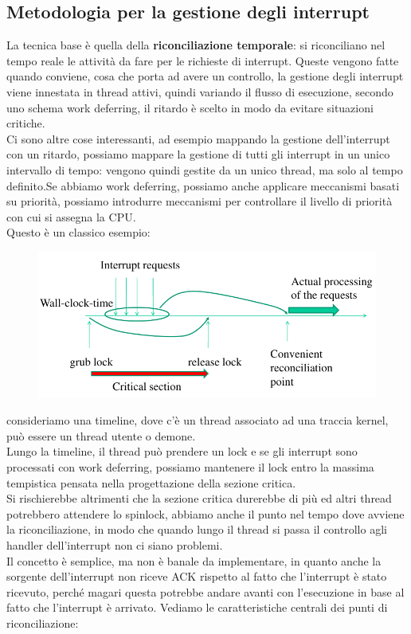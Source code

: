 \documentclass[12pt, oneside]{extbook}
\begin{document}
\subsection{Metodologia per la gestione degli interrupt}
La tecnica base è quella della \textbf{riconciliazione temporale}: si riconciliano nel tempo reale le attività da fare per le richieste di interrupt. Queste vengono fatte quando conviene, cosa che porta ad avere un controllo, la gestione degli interrupt viene innestata in thread attivi, quindi variando il flusso di esecuzione, secondo uno schema work deferring, il ritardo è scelto in modo da evitare situazioni critiche.\\Ci sono altre cose interessanti, ad esempio mappando la gestione dell'interrupt con un ritardo, possiamo mappare la gestione di tutti gli interrupt in un unico intervallo di tempo: vengono quindi gestite da un unico thread, ma solo al tempo definito.Se abbiamo work deferring, possiamo anche applicare meccanismi basati su priorità, possiamo introdurre meccanismi per controllare il livello di priorità con cui si assegna la CPU.\\Questo è un classico esempio:
\begin{figure}
	\includegraphics[scale=0.4]{immagini/deferred_work_timeline.png}
\end{figure}
consideriamo una timeline, dove c'è un thread associato ad una traccia kernel, può essere un thread utente o demone.\\Lungo la timeline, il thread può prendere un lock e se gli interrupt sono processati con work deferring, possiamo mantenere il lock entro la massima tempistica pensata nella progettazione della sezione critica.\\Si rischierebbe altrimenti che la sezione critica durerebbe di più ed altri thread potrebbero attendere lo spinlock, abbiamo anche il punto nel tempo dove avviene la riconciliazione, in modo che quando lungo il thread si passa il controllo agli handler dell'interrupt non ci siano problemi.\\Il concetto è semplice, ma non è banale da implementare, in quanto anche la sorgente dell'interrupt non riceve ACK rispetto al fatto che l'interrupt è stato ricevuto, perché magari questa potrebbe andare avanti con l'esecuzione in base al fatto che l'interrupt è arrivato. Vediamo le caratteristiche centrali dei punti di riconciliazione:
\end{document}

